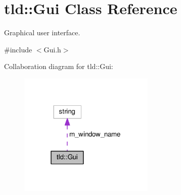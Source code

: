 \hypertarget{classtld_1_1Gui}{\section{tld\-:\-:Gui Class Reference}
\label{classtld_1_1Gui}
}


Graphical user interface.  




{\ttfamily \#include $<$Gui.\-h$>$}



Collaboration diagram for tld\-:\-:Gui\-:\nopagebreak
\begin{figure}[H]
\begin{center}
\leavevmode
\includegraphics[width=183pt]{classtld_1_1Gui__coll__graph}
\end{center}
\end{figure}
